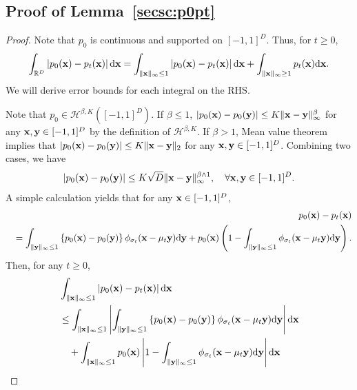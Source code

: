 \documentclass[twoside,11pt]{article}
\def\cH{\mathcal H}
\newcommand{\bx}{{\bf x}}
\newcommand{\by}{{\bf y}}
\newcommand{\bbR}{{\mathbb R}}
\newcommand{\be}{\begin{equation}}
\newcommand{\ee}{\end{equation}}
\newcommand{\bean}{\setlength\arraycolsep{1pt}\begin{eqnarray*}}
\newcommand{\eean}{\end{eqnarray*}}
\def\d{{\rm d}}
\begin{document}
\subsection{Proof of Lemma~\ref{secsc:p0pt}}
\begin{proof}
Note that $p_0$ is continuous and supported on $[-1,1]^{D}$.
Thus, for $t \geq 0$,
\bean
\int_{\bbR^{D}} \left\vert p_0(\bx) - p_t(\bx) \right\vert \d \bx
= \int_{ \| \bx \|_{\infty} \leq 1 } \left\vert p_0(\bx) - p_t(\bx) \right\vert \d \bx
+ \int_{ \| \bx \|_{\infty} \geq 1} p_t(\bx) \d \bx.
\eean
We will derive error bounds for each integral on the RHS.

Note that $p_0 \in \cH^{\beta, K}([-1,1]^{D})$.
If $\beta \leq 1$, $\vert p_0(\bx) - p_0(\by) \vert \leq K \| \bx - \by\|_{\infty}^{\beta}$  for any $\bx, \by \in [-1,1]^{D}$ by the definition of $\cH^{\beta, K}$.
If $\beta > 1$, Mean value theorem implies that 
$\vert p_0(\bx) - p_0(\by) \vert \leq K \| \bx - \by\|_{2}$ for any $\bx, \by \in [-1,1]^{D}$. 
Combining two cases, we have
\be
\vert p_0(\bx) - p_0(\by) \vert \leq K\sqrt{D} \| \bx - \by\|_{\infty}^{\beta \wedge 1}
, \quad \forall \bx,\by \in [-1,1]^{D}. \label{eqlemtv:lip}
\ee
A simple calculation yields that for any $\bx \in [-1,1]^{D}$,
\bean
&& p_0(\bx)-p_t(\bx)
\\
&& = \int_{\| \by \|_{\infty} \leq 1} \left\{ 
p_0(\bx) - p_0(\by) \right\} \phi_{\sigma_t}(\bx-\mu_t \by) \d \by + p_{0}(\bx) \left( 1 - \int_{\| \by \|_{\infty} \leq 1} \phi_{\sigma_t}(\bx-\mu_t \by) \d \by \right).
\eean
Then, for any $t \geq 0$,
\be \begin{split}
&  \int_{\| \bx \|_{\infty} \leq 1} \left\vert p_0(\bx) - p_t(\bx) \right\vert \d \bx 
\\
& \leq \int_{\| \bx \|_{\infty} \leq 1} \left\vert   \int_{\| \by \|_{\infty} \leq 1} \left\{ p_0(\bx) - p_0(\by) \right\} \phi_{\sigma _t}(\bx - \mu_t \by) \d \by \right\vert \d \bx 
\\
& \quad + \int_{\| \bx \|_{\infty} \leq 1} p_0(\bx) \left\vert  1 - \int_{\| \by \|_{\infty} \leq 1} \phi_{\sigma_t}(\bx-\mu_t \by) \d \by  \right\vert \d \bx
\label{eqlemtv:int}
\end{split}
\ee


\end{proof}
\end{document}
